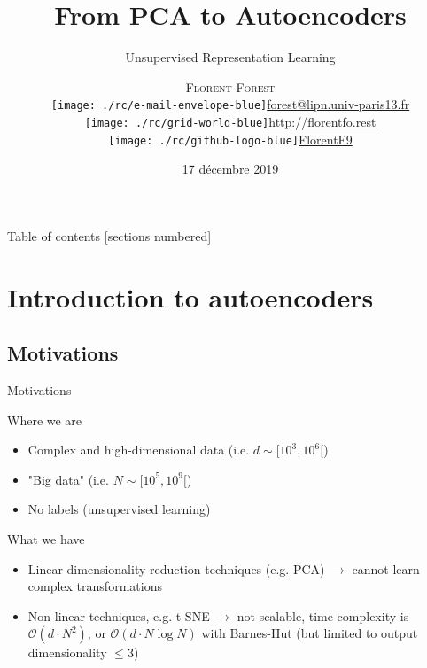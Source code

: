 \documentclass{beamer}
\title{From PCA to Autoencoders}
\subtitle{Unsupervised Representation Learning}
\date{17 décembre 2019}
\author{\textsc{Florent Forest}\vspace{0.2cm}\\
\texttt{[image: ./rc/e-mail-envelope-blue]}\;\scriptsize{\href{mailto:forest@lipn.univ-paris13.fr}{forest@lipn.univ-paris13.fr}}\\
\texttt{[image: ./rc/grid-world-blue]}\;\scriptsize{\href{http://florentfo.rest}{http://florentfo.rest}}\\
\texttt{[image: ./rc/github-logo-blue]}\;\scriptsize{\href{https://github.com/FlorentF9}{FlorentF9}}\\
}
\institute{\vfill\hfill
\texttt{[image: ./rc/logo\_supaero]}}
\begin{document}
  \maketitle

  \begin{frame}{Table of contents}
    [sections numbered]
    \begin{small}
      \vspace{0.5cm}
      \tableofcontents%
    \end{small}
  \end{frame}

  \section{Introduction to autoencoders}

  \subsection{Motivations}

  \begin{frame}{Motivations}

    \begin{block}{Where we are}
      \begin{itemize}
        \item Complex and high-dimensional data (i.e. $d \sim [10^3, 10^6[$)
        \item "Big data" (i.e. $N \sim [10^5, 10^9[$)
        \item No labels (unsupervised learning)
      \end{itemize}
    \end{block}

    \begin{block}{What we have}
      \begin{itemize}
        \item Linear dimensionality reduction techniques (e.g. PCA) $\rightarrow$ cannot learn complex transformations
        \item Non-linear techniques, e.g. t-SNE $\rightarrow$ not scalable, time complexity is $\mathcal{O}(d \cdot N^2)$, or $\mathcal{O}(d \cdot N\log N)$ with Barnes-Hut (but limited to output dimensionality $\leq 3$)
      \end{itemize}
    \end{block}

  \end{frame}
\end{document}
